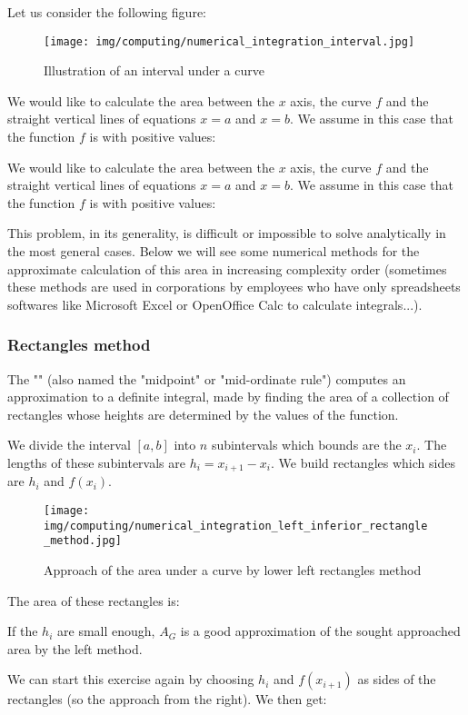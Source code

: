 	Let us consider the following figure:
	\begin{figure}[H]
		\centering
		\texttt{[image: img/computing/numerical\_integration\_interval.jpg]}
		\caption{Illustration of an interval under a curve}
	\end{figure}
	We would like to calculate the area between the $x$ axis, the curve $f$ and the straight vertical lines of equations $x=a$ and $x=b$. We assume in this case that the function $f$ is with positive values:
	
	We would like to calculate the area between the $x$ axis, the curve $f$ and the straight vertical lines of equations $x=a$ and $x=b$. We assume in this case that the function $f$ is with positive values:
	
	This problem, in its generality, is difficult or impossible to solve analytically in the most general cases. Below we will see some numerical methods for the approximate calculation of this area in increasing complexity order (sometimes these methods are used in corporations by employees who have only spreadsheets softwares like Microsoft Excel or OpenOffice Calc to calculate integrals...).
	
	\subsubsection{Rectangles method}
	The "" (also named the "midpoint" or "mid-ordinate rule") computes an approximation to a definite integral, made by finding the area of a collection of rectangles whose heights are determined by the values of the function.
	
	We divide the interval $[a,b]$ into $n$ subintervals which bounds are the $x_i$. The lengths of these subintervals are $h_i=x_{i+1}-x_i$. We build rectangles which sides are $h_i$ and $f(x_i)$.
	
	\begin{figure}[H]
		\centering
		\texttt{[image: img/computing/numerical\_integration\_left\_inferior\_rectangle\_method.jpg]}
		\caption{Approach of the area under a curve by lower left rectangles method}
	\end{figure}
	The area of these rectangles is:
	
	If the $h_i$ are small enough, $A_G$ is a good approximation of the sought approached area by the left method.

	We can start this exercise again by choosing $h_i$ and $f(x_{i+1})$ as sides of the rectangles (so the approach from the right). We then get:
	
